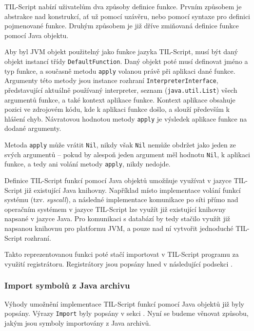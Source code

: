 TIL-Script nabízí uživatelům dva způsoby definice funkce. Prvním způsobem je abstrakce
nad konstrukcí, ať už pomocí uzávěru, nebo pomocí syntaxe pro definici pojmenované funkce. Druhým
způsobem je již dříve zmiňovaná definice funkce pomocí Java objektu.

Aby byl JVM objekt použitelný jako funkce jazyka TIL-Script, musí být daný objekt instancí třídy
\lstinline{DefaultFunction}. Daný objekt poté musí definovat jméno a typ funkce, a současně metodu
\lstinline{apply} volanou právě při aplikaci dané funkce. Argumenty této metody jsou instance
rozhraní \lstinline{InterpreterInterface}, představující aktuálně používaný interpreter, seznam
(\lstinline{java.util.List}) všech argumentů funkce, a také kontext aplikace funkce. Kontext
aplikace obsahuje pozici ve zdrojovém kódu, kde k aplikaci funkce došlo, a slouží především
k hlášení chyb. Návratovou hodnotou metody \lstinline{apply} je výsledek aplikace funkce na dodané
argumenty.

Metoda \lstinline{apply} může vrátit \lstinline{Nil}, nikdy však \lstinline{Nil} nemůže obdržet
jako jeden ze svých argumentů -- pokud by alespoň jeden argument měl hodnotu \lstinline{Nil},
k aplikaci funkce, a tedy ani volání metody \lstinline{apply}, nikdy nedojde.

Definice TIL-Script funkcí pomocí Java objektů umožňuje využívat v jazyce TIL-Script již existující
Java knihovny. Například místo implementace volání funkcí systému (tzv. \textit{syscall}),
a následné implementace komunikace po síti přímo nad operačním systémem v jazyce TIL-Script lze
využít již existující knihovny napsané v jazyce Java. Pro komunikaci s databází by tedy stačilo
využít již napsanou knihovnu pro platformu JVM, a pouze nad ní vytvořit jednoduché TIL-Script
rozhraní.

Takto reprezentovanou funkci poté stačí importovat v TIL-Script programu za využití registrátoru.
Registrátory jsou popsány hned v následující podsekci .

\subsubsection{Import symbolů z Java archivu}\label{java-import}

Výhody umožnění implementace TIL-Script funkcí pomocí Java objektů již byly popsány. Výrazy
\lstinline{Import} byly popsány v sekci . Nyní se budeme věnovat způsobu,
jakým jsou symboly importovány z Java archivů.

